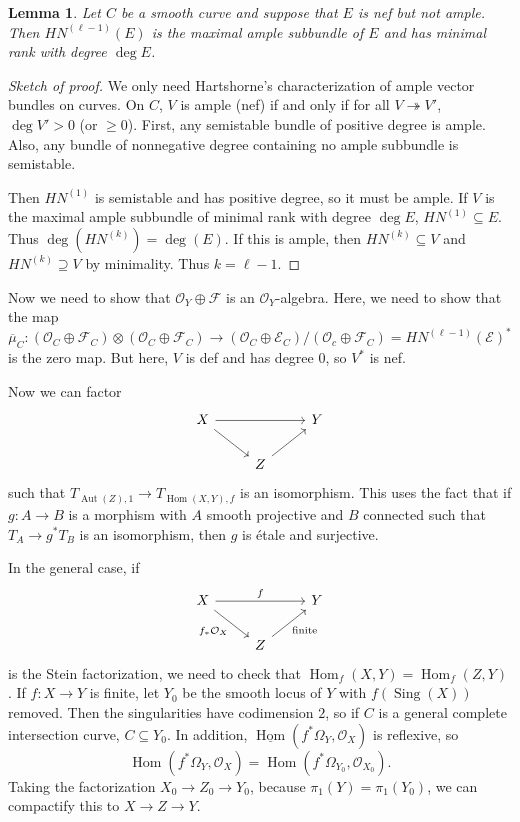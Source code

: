 \documentclass[leqno, openany]{memoir}
\newtheorem{lem}[thm]{Lemma}
\theoremstyle{definition}
\theoremstyle{remark}
\theoremstyle{plain}
\theoremstyle{definition}
\theoremstyle{remark}
\newcommand{\mc}[1]{\mathcal{#1}}
\newcommand{\on}[1]{\operatorname{#1}}
\newcommand{\ol}[1]{\overline{#1}}
\newcommand{\ul}[1]{\underline{#1}}
\DeclareMathOperator{\Hom}{Hom}
\DeclareMathOperator{\Aut}{Aut}
\begin{document}
\begin{lem}
    Let $C$ be a smooth curve and suppose that $E$ is nef but not ample. Then $HN^{(\ell-1)}(E)$ is the maximal ample subbundle of $E$ and has minimal rank with degree $\deg E$.
\end{lem}

\begin{proof}[Sketch of proof]
    We only need Hartshorne's characterization of ample vector bundles on curves. On $C$, $V$ is ample (nef) if and only if for all $V \twoheadrightarrow V'$, $\deg V' > 0$ (or $\geq 0$). First, any semistable bundle of positive degree is ample. Also, any bundle of nonnegative degree containing no ample subbundle is semistable.

    Then $HN^{(1)}$ is semistable and has positive degree, so it must be ample. If $V$ is the maximal ample subbundle of minimal rank with degree $\deg E$, $HN^{(1)} \subseteq E$. Thus $\deg (HN^{(k)}) = \deg (E)$. If this is ample, then $HN^{(k)} \subseteq V$ and $HN^{(k)} \supseteq V$ by minimality. Thus $k = \ell - 1$.
\end{proof}

Now we need to show that $\mc{O}_Y \oplus \mc{F}$ is an $\mc{O}_Y$-algebra. Here, we need to show that the map
\[ \ol{\mu}_C \colon (\mc{O}_C \oplus \mc{F}_C) \otimes (\mc{O}_C \oplus \mc{F}_C) \to (\mc{O}_C \oplus \mc{E}_C) / (\mc{O}_c \oplus \mc{F}_C) = HN^{(\ell-1)}(\mc{E})^* \]
is the zero map. But here, $V$ is def and has degree $0$, so $V^*$ is nef. 

Now we can factor
\begin{equation*}
\begin{tikzcd}
    X \ar{rr} \ar{dr} && Y \\
    & Z \ar{ur}
\end{tikzcd}
\end{equation*}
such that $T_{\Aut(Z), 1} \to T_{\Hom(X, Y), f}$ is an isomorphism. This uses the fact that if $g \colon A \to B$ is a morphism with $A$ smooth projective and $B$ connected such that $T_A \to g^* T_B$ is an isomorphism, then $g$ is \'etale and surjective.

In the general case, if 
\begin{equation*}
\begin{tikzcd}
    X \ar{rr}{f} \ar[swap]{dr}{f_* \mc{O}_X} & & Y \\
    & Z \ar[swap]{ur}{\text{finite}}
\end{tikzcd}
\end{equation*}
is the Stein factorization, we need to check that $\Hom_f(X, Y) = \Hom_f(Z, Y)$. If $f \colon X \to Y$ is finite, let $Y_0$ be the smooth locus of $Y$ with $f(\on{Sing}(X))$ removed. Then the singularities have codimension $2$, so if $C$ is a general complete intersection curve, $C \subseteq Y_0$. In addition, $\ul{\Hom}(f^* \Omega_Y, \mc{O}_X)$ is reflexive, so
\[ \Hom(f^* \Omega_Y, \mc{O}_X) = \Hom(f^* \Omega_{Y_0}, \mc{O}_{X_0}). \]
Taking the factorization $X_0 \to Z_0 \to Y_0$, because $\pi_1(Y) = \pi_1(Y_0)$, we can compactify this to $X \to Z \to Y$.
\end{document}
